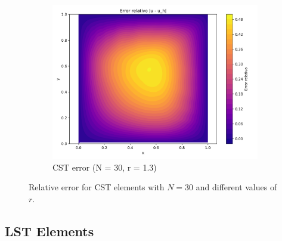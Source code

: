 \documentclass[12pt]{article}
\begin{document}
\begin{figure}[H]
    \hfill
    \begin{subfigure}[t]{0.32\textwidth}
        \centering
        \includegraphics[width=\textwidth]{Graficos/33/CST_relative_error_colormap.png}
        \caption{CST error (N = 30, r = 1.3)}
        \label{fig:cst_error_r1.3_n30}
    \end{subfigure}
    \caption{Relative error for CST elements with $N = 30$ and different values of $r$.}
    \label{fig:cst_error_comparison_n30}
\end{figure}


\subsection{LST Elements}
\end{document}
